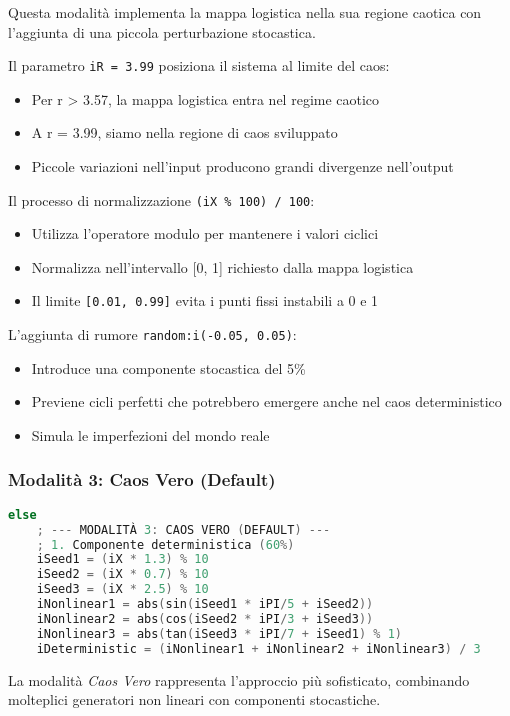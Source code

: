 Questa modalità implementa la mappa logistica nella sua regione caotica con l'aggiunta di una piccola perturbazione stocastica.

Il parametro \texttt{iR = 3.99} posiziona il sistema al limite del caos:
\begin{itemize}
    \item Per r > 3.57, la mappa logistica entra nel regime caotico
    \item A r = 3.99, siamo nella regione di caos sviluppato
    \item Piccole variazioni nell'input producono grandi divergenze nell'output
\end{itemize}

Il processo di normalizzazione \texttt{(iX \% 100) / 100}:
\begin{itemize}
    \item Utilizza l'operatore modulo per mantenere i valori ciclici
    \item Normalizza nell'intervallo [0, 1] richiesto dalla mappa logistica
    \item Il limite \texttt{[0.01, 0.99]} evita i punti fissi instabili a 0 e 1
\end{itemize}

L'aggiunta di rumore \texttt{random:i({-}0.05, 0.05)}:
\begin{itemize}
    \item Introduce una componente stocastica del 5\%
    \item Previene cicli perfetti che potrebbero emergere anche nel caos deterministico
    \item Simula le imperfezioni del mondo reale
\end{itemize}
\subsubsection{Modalità 3: Caos Vero (Default)}
\begin{lstlisting}[language=C]
else
    ; --- MODALITÀ 3: CAOS VERO (DEFAULT) ---
    ; 1. Componente deterministica (60%)
    iSeed1 = (iX * 1.3) % 10
    iSeed2 = (iX * 0.7) % 10
    iSeed3 = (iX * 2.5) % 10
    iNonlinear1 = abs(sin(iSeed1 * iPI/5 + iSeed2))
    iNonlinear2 = abs(cos(iSeed2 * iPI/3 + iSeed3))
    iNonlinear3 = abs(tan(iSeed3 * iPI/7 + iSeed1) % 1)
    iDeterministic = (iNonlinear1 + iNonlinear2 + iNonlinear3) / 3
\end{lstlisting}

La modalità \textit{Caos Vero} rappresenta l'approccio più sofisticato, combinando molteplici generatori non lineari con componenti stocastiche.

